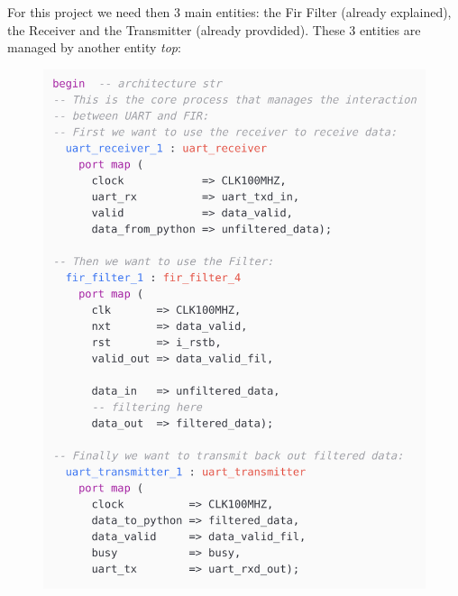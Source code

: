 \documentclass[11pt,a4paper,twocolumn]{IEEEtran}
\begin{document}
	For this project we need then 3 main entities: the Fir Filter (already explained), the Receiver and the Transmitter (already provdided). These 3 entities are managed by another entity \emph{top}:
	\begin{figure}[h]
		\centering
		\hspace*{-.8cm}\includegraphics[width=1.1\linewidth]{img/code1}
	\end{figure}
\end{document}
